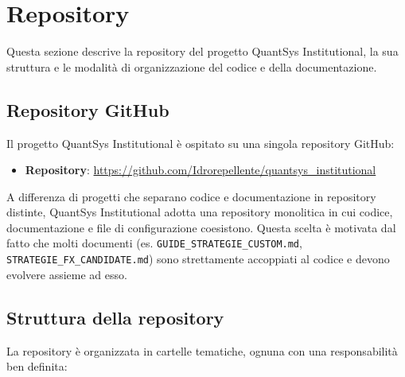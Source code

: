 \section{Repository}

Questa sezione descrive la repository del progetto QuantSys Institutional, la sua struttura e le modalità di organizzazione del codice e della documentazione.

\subsection{Repository GitHub}

Il progetto QuantSys Institutional è ospitato su una singola repository GitHub:

\begin{itemize}
  \item \textbf{Repository}: \url{https://github.com/Idrorepellente/quantsys_institutional}
\end{itemize}

A differenza di progetti che separano codice e documentazione in repository distinte, QuantSys Institutional adotta una repository monolitica in cui codice, documentazione e file di configurazione coesistono. Questa scelta è motivata dal fatto che molti documenti (es. \texttt{GUIDE\_STRATEGIE\_CUSTOM.md}, \texttt{STRATEGIE\_FX\_CANDIDATE.md}) sono strettamente accoppiati al codice e devono evolvere assieme ad esso.

\subsection{Struttura della repository}

La repository è organizzata in cartelle tematiche, ognuna con una responsabilità ben definita:


